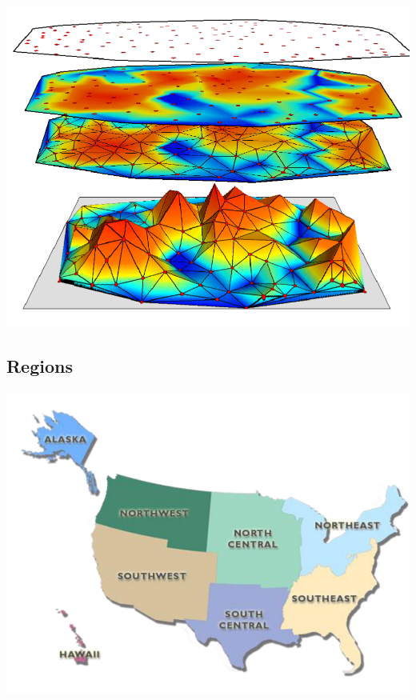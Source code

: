 \documentclass[11pt]{article}
\theoremstyle{definition}
\begin{document}
\includegraphics[width=\textwidth/3]{17.png}

\subsection{Regions}
\includegraphics[width=\textwidth/3]{18.png}
\end{document}
